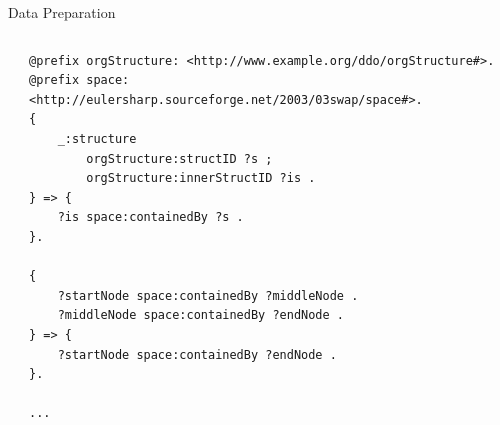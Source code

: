 \message{ !name(presentation.tex)}\documentclass{beamer}
\begin{document}
\begin{frame}[fragile]{Data Preparation}
\begin{columns}
\begin{column}{.3\textwidth}
\end{column}%
\hfill%
\begin{column}{.66\textwidth}
{\tiny
\begin{verbatim}
@prefix orgStructure: <http://www.example.org/ddo/orgStructure#>.
@prefix space: <http://eulersharp.sourceforge.net/2003/03swap/space#>.
{
    _:structure
        orgStructure:structID ?s ;
        orgStructure:innerStructID ?is .
} => {
    ?is space:containedBy ?s .
}.

{
    ?startNode space:containedBy ?middleNode .
    ?middleNode space:containedBy ?endNode .
} => {
    ?startNode space:containedBy ?endNode .
}.

...
\end{verbatim}
}
\end{column}%
\end{columns}
\end{frame}
\end{document}
